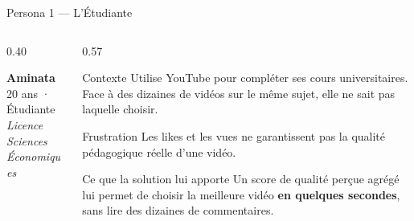 \documentclass[aspectratio=169, 12pt]{beamer}
\begin{document}
\begin{frame}{Persona 1 — L'Étudiante}
  \begin{columns}[T]
    \begin{column}{0.40\textwidth}
      \begin{center}
        \vspace{0.5cm}
        {\LARGE\textcolor{mainblue}{\textbf{Aminata}}}\\[0.3em]
        {\large 20 ans · Étudiante}\\[0.2em]
        \textit{Licence Sciences Économiques}
      \end{center}
    \end{column}
    \begin{column}{0.57\textwidth}
      \begin{block}{Contexte}
        \small Utilise YouTube pour compléter ses cours universitaires.
        Face à des dizaines de vidéos sur le même sujet, elle ne sait
        pas laquelle choisir.
      \end{block}
      \vspace{0.2cm}
      \begin{alertblock}{Frustration}
        \small Les likes et les vues ne garantissent pas la qualité
        pédagogique réelle d'une vidéo.
      \end{alertblock}
      \vspace{0.2cm}
      \begin{exampleblock}{Ce que la solution lui apporte}
        \small Un score de qualité perçue agrégé lui permet de choisir
        la meilleure vidéo \textbf{en quelques secondes}, sans lire
        des dizaines de commentaires.
      \end{exampleblock}
    \end{column}
  \end{columns}
\end{frame}
\end{document}
